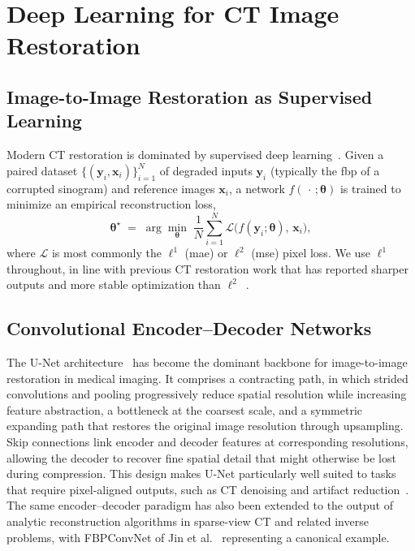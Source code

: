 \section{Deep Learning for CT Image Restoration}
\label{sec:bg_dl_restoration}

\subsection{Image-to-Image Restoration as Supervised Learning}
\label{subsec:bg_supervised}

Modern CT restoration is dominated by supervised deep learning~\cite{LeCun2015, Sadia2024}. Given a paired dataset $\{(\boldsymbol{y}_{i},\boldsymbol{x}_{i})\}_{i=1}^{N}$ of degraded inputs $\boldsymbol{y}_{i}$ (typically the \gls{fbp} of a corrupted sinogram) and reference images $\boldsymbol{x}_{i}$, a network $f(\,\cdot\,;\boldsymbol{\theta})$ is trained to minimize an empirical reconstruction loss,
\begin{equation}
    \boldsymbol{\theta}^{\star}
    \;=\; \arg\min_{\boldsymbol{\theta}} \;
    \frac{1}{N}\sum_{i=1}^{N}
    \mathcal{L}\!\bigl(f(\boldsymbol{y}_{i};\boldsymbol{\theta}),\,\boldsymbol{x}_{i}\bigr),
    \label{eq:supervised_loss}
\end{equation}
where $\mathcal{L}$ is most commonly the $\ell^{1}$ (\gls{mae}) or $\ell^{2}$ (\gls{mse}) pixel loss. We use $\ell^{1}$ throughout, in line with previous CT restoration work that has reported sharper outputs and more stable optimization than $\ell^{2}$~\cite{Chen2017, Zhang2017}.

\subsection{Convolutional Encoder--Decoder Networks}
\label{subsec:bg_unet}

The U-Net architecture~\cite{Ronneberger2015} has become the dominant backbone for image-to-image restoration in medical imaging. It comprises a contracting path, in which strided convolutions and pooling progressively reduce spatial resolution while increasing feature abstraction, a bottleneck at the coarsest scale, and a symmetric expanding path that restores the original image resolution through upsampling. Skip connections link encoder and decoder features at corresponding resolutions, allowing the decoder to recover fine spatial detail that might otherwise be lost during compression. This design makes U-Net particularly well suited to tasks that require pixel-aligned outputs, such as CT denoising and artifact reduction~\cite{Komolafe2024, Zhang2023}. The same encoder--decoder paradigm has also been extended to the output of analytic reconstruction algorithms in sparse-view CT and related inverse problems, with FBPConvNet of Jin et al.~\cite{Jin2017} representing a canonical example.

